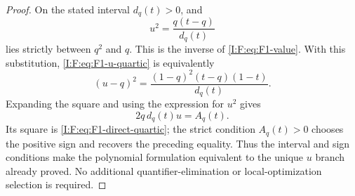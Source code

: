 \begin{proof}
On the stated interval $d_q(t)>0$, and
\[
 u^2=\frac{q(t-q)}{d_q(t)}
\]
lies strictly between $q^2$ and $q$. This is the inverse of
\eqref{I:F:eq:F1-value}. With this substitution,
\eqref{I:F:eq:F1-u-quartic} is equivalently
\[
 (u-q)^2=
 \frac{(1-q)^2(t-q)(1-t)}{d_q(t)}.
\]
Expanding the square and using the expression for $u^2$ gives
\[
 2q\,d_q(t)u=A_q(t).
\]
Its square is \eqref{I:F:eq:F1-direct-quartic}; the strict condition
$A_q(t)>0$ chooses the positive sign and recovers the preceding equality.
Thus the interval and sign conditions make the polynomial formulation
equivalent to the unique $u$ branch already proved. No additional
quantifier-elimination or local-optimization selection is required.
\end{proof}
